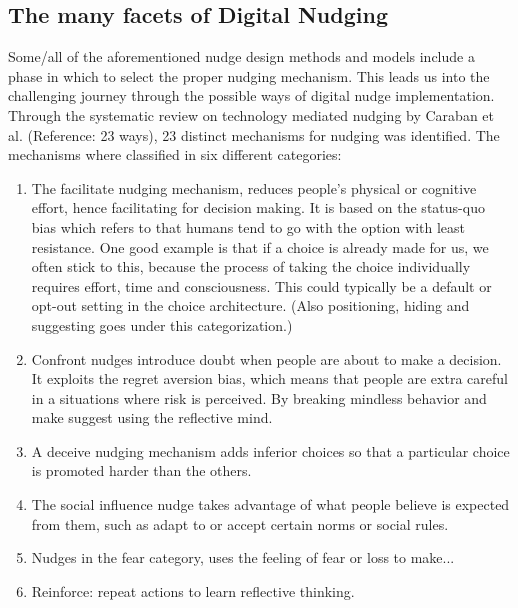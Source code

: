 {%

\subsection{The many facets of Digital Nudging}
Some/all of the aforementioned nudge design methods and models include a phase in which to select the proper nudging mechanism. This leads us into the challenging journey through the possible ways of digital nudge implementation. Through the systematic review on technology mediated nudging by Caraban et al. (Reference: 23 ways), 23 distinct mechanisms for nudging was identified. The mechanisms where classified in six different categories:

\begin{enumerate}
\item The facilitate nudging mechanism, reduces people's physical or cognitive effort, hence facilitating for decision making. It is based on the status-quo bias which refers to that humans tend to go with the option with least resistance. One good example is that if a choice is already made for us, we often stick to this, because the process of taking the choice individually requires effort, time and consciousness. This could typically be a default or opt-out setting in the choice architecture. (Also positioning, hiding and suggesting goes under this categorization.) 
\item Confront nudges introduce doubt when people are about to make a decision. It exploits the regret aversion bias, which means that people are extra careful in a situations where risk is perceived. By breaking mindless behavior and make suggest using the reflective mind. 
\item A deceive nudging mechanism adds inferior choices so that a particular choice is promoted harder than the others. 
\item The social influence nudge takes advantage of what people believe is expected from them, such as adapt to or accept certain norms or social rules. 
\item Nudges in the fear category, uses the feeling of fear or loss to make... 
\item Reinforce: repeat actions to learn reflective thinking. 
\end{enumerate}

}
